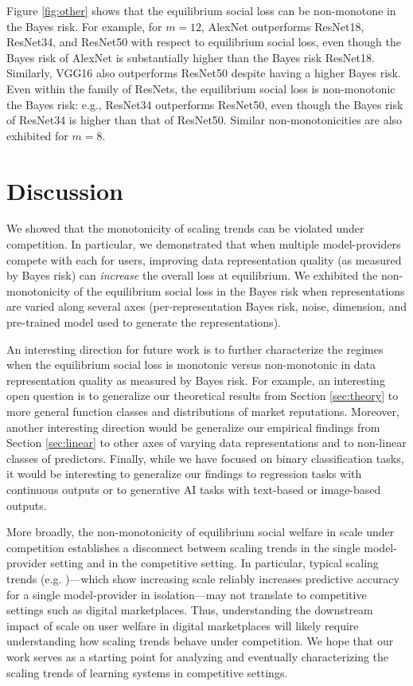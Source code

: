 \documentclass[letterpaper,11pt]{article}
\theoremstyle{plain}
\begin{document}
Figure \ref{fig:other} shows that the equilibrium social loss can be non-monotone in the Bayes risk. For example, for $m = 12$, AlexNet outperforms ResNet18, ResNet34, and ResNet50 with respect to equilibrium social loss, even though the Bayes risk of AlexNet is substantially higher than the Bayes risk ResNet18. Similarly, VGG16 also outperforms ResNet50 despite having a higher Bayes risk. Even within the family of ResNets, the equilibrium social loss is non-monotonic the Bayes risk: e.g., ResNet34 outperforms ResNet50, even though the Bayes risk of ResNet34 is higher than that of ResNet50. Similar non-monotonicities are also exhibited for $m=8$. 



\section{Discussion} 

We showed that the monotonicity of scaling trends can be violated under competition. In particular, we demonstrated that when multiple model-providers compete with each for users, improving data representation quality (as measured by Bayes risk) can \textit{increase} the overall loss at equilibrium. We exhibited the non-monotonicity of the equilibrium social loss in the Bayes risk when representations are varied along several axes (per-representation Bayes risk, noise, dimension, and pre-trained model used to generate the representations). 

An interesting direction for future work is to further characterize the regimes when the equilibrium social loss is monotonic versus non-monotonic in data representation quality as measured by Bayes risk. For example, an interesting open question is to generalize our theoretical results from Section \ref{sec:theory} to more general function classes and distributions of market reputations. Moreover, another interesting direction would be generalize our empirical findings from Section \ref{sec:linear} to other axes of varying data representations and to non-linear classes of predictors. Finally, while we have focused on binary classification tasks, it would be interesting to generalize our findings to regression tasks with continuous outputs or to generative AI tasks with text-based or image-based outputs. 

More broadly, the non-monotonicity of equilibrium social welfare in scale under competition establishes a disconnect between scaling trends in the single model-provider setting and in the competitive setting. In particular, typical scaling trends (e.g. \citep{K20, SK20, B21, H22, hernandez2021scaling})---which show increasing scale reliably increases predictive accuracy for a single model-provider in isolation---may not translate to competitive settings such as digital marketplaces. Thus, understanding the downstream impact of scale on user welfare in digital marketplaces will likely require understanding how scaling trends behave under competition. We hope that our work serves as a starting point for analyzing and eventually characterizing the scaling trends of learning systems in competitive settings.
\end{document}
